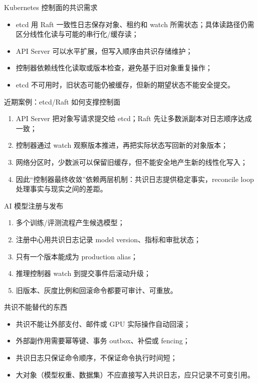 \documentclass[UTF8,fontset=none,aspectratio=169,10pt]{beamer}
\begin{document}

\begin{frame}{Kubernetes 控制面的共识需求}
\begin{itemize}
  \item etcd 用 Raft 一致性日志保存对象、租约和 watch 所需状态；具体读路径仍需区分线性化读与可能的串行化/缓存读；
  \item API Server 可以水平扩展，但写入顺序由共识存储维护；
  \item 控制器依赖线性化读取或版本检查，避免基于旧对象重复操作；
  \item etcd 不可用时，旧状态可能仍被缓存，但新的期望状态不能安全提交。
\end{itemize}
\end{frame}

\begin{frame}{近期案例：etcd/Raft 如何支撑控制面}
\begin{enumerate}
  \item API Server 把对象写请求提交给 etcd；Raft 先让多数派副本对日志顺序达成一致；
  \item 控制器通过 watch 观察版本推进，再把实际状态写回新的对象版本；
  \item 网络分区时，少数派可以保留旧缓存，但不能安全地产生新的线性化写入；
  \item 因此“控制器最终收敛”依赖两层机制：共识日志提供稳定事实，reconcile loop 处理事实与现实之间的差距。
\end{enumerate}
\vfill
{}
\end{frame}

\begin{frame}{AI 模型注册与发布}
\begin{enumerate}
  \item 多个训练/评测流程产生候选模型；
  \item 注册中心用共识日志记录 model version、指标和审批状态；
  \item 只有一个版本能成为 production alias；
  \item 推理控制器 watch 到提交事件后滚动升级；
  \item 旧版本、灰度比例和回滚命令都要可审计、可重放。
\end{enumerate}
\end{frame}

\begin{frame}{共识不能替代的东西}
\begin{itemize}
  \item 共识不能让外部支付、邮件或 GPU 实际操作自动回滚；
  \item 外部副作用需要幂等键、事务 outbox、补偿或 fencing；
  \item 共识日志只保证命令顺序，不保证命令执行时间短；
  \item 大对象（模型权重、数据集）不应直接写入共识日志，应只记录不可变引用。
\end{itemize}
\end{frame}
\end{document}
